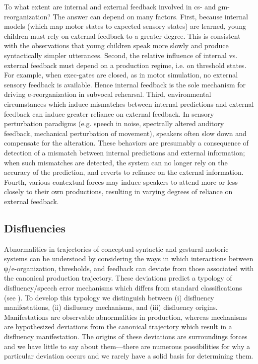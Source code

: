   To what extent are internal and external feedback involved in cs- and gm- reorganization? The answer can depend on many factors. First, because internal models (which map motor states to expected sensory states) are learned, young children must rely on external feedback to a greater degree. This is consistent with the observations that young children speak more slowly and produce syntactically simpler utterances. Second, the relative influence of internal vs. external feedback must depend on a production regime, i.e. on threshold states. For example, when exec-gates are closed, as in motor simulation, no external sensory feedback is available. Hence internal feedback is the sole mechanism for driving e-reorganization in subvocal rehearsal. Third, environmental circumstances which induce mismatches between internal predictions and external feedback can induce greater reliance on external feedback. In sensory perturbation paradigms (e.g. speech in noise, spectrally altered auditory feedback, mechanical perturbation of movement), speakers often slow down and compensate for the alteration. These behaviors are presumably a consequence of detection of a mismatch between internal predictions and external information; when such mismatches are detected, the system can no longer rely on the accuracy of the prediction, and reverts to reliance on the external information. Fourth, various contextual forces may induce speakers to attend more or less closely to their own productions, resulting in varying degrees of reliance on external feedback.

\subsection{Disfluencies}

Abnormalities in trajectories of conceptual-syntactic and gestural-motoric systems can be understood by considering the ways in which interactions between φ/e-organization, thresholds, and feedback can deviate from those associated with the canonical production trajectory. These deviations predict a typology of disfluency/speech error mechanisms which differs from standard classifications (see \citealt{Fromkin1971,Fromkin1984,Shriberg2001}). To develop this typology we distinguish between (i) disfluency manifestations, (ii) disfluency mechanisms, and (iii) disfluency origins. Manifestations are observable abnormalities in production, whereas mechanisms are hypothesized deviations from the canonical trajectory which result in a disfluency manifestation. The origins of these deviations are surroundings forces and we have little to say about them—there are numerous possibilities for why a particular deviation occurs and we rarely have a solid basis for determining them. 

